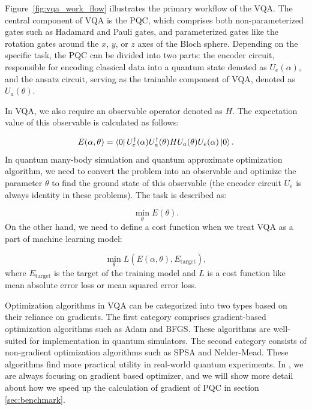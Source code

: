 Figure~\ref{fig:vqa_work_flow} illustrates the primary workflow of the VQA. The central component of VQA is the PQC, which comprises both non-parameterized gates such as Hadamard and Pauli gates, and parameterized gates like the rotation gates around the $x$, $y$, or $z$ axes of the Bloch sphere. Depending on the specific task, the PQC can be divided into two parts: the encoder circuit, responsible for encoding classical data into a quantum state denoted as $U_e(\alpha)$, and the ansatz circuit, serving as the trainable component of VQA, denoted as $U_a(\theta)$.

In VQA, we also require an observable operator denoted as $H$. The expectation value of this observable is calculated as follows:

\begin{equation}
  E(\alpha, \theta) = \bra{0}U_e^\dagger(\alpha)U_a^\dagger(\theta)HU_a(\theta)U_e(\alpha)\ket{0}.
\end{equation}
In quantum many-body simulation and quantum approximate optimization algorithm, we need to convert the problem into an observable and optimize the parameter $\theta$ to find the ground state of this observable (the encoder circuit $U_e$ is always identity in these problems). The task is described as:

\begin{equation}
  \min_\theta E(\theta).
\end{equation}
On the other hand, we need to define a cost function when we treat VQA as a part of machine learning model:

\begin{equation}
  \min_\theta L(E(\alpha, \theta), E_\text{target}),
\end{equation}
where $E_\text{target}$ is the target of the training model and $L$ is a cost function like mean absolute error loss or mean squared error loss.

Optimization algorithms in VQA can be categorized into two types based on their reliance on gradients. The first category comprises gradient-based optimization algorithms such as Adam and BFGS. These algorithms are well-suited for implementation in quantum simulators. The second category consists of non-gradient optimization algorithms such as SPSA and Nelder-Mead. These algorithms find more practical utility in real-world quantum experiments. In \MindQuantum, we are always focusing on gradient based optimizer, and we will show more detail about how we speed up the calculation of gradient of PQC in section \ref{sec:benchmark}.

